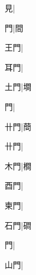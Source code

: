 \begin{multicols}{2}
{{\cjk{}{\cnsym{}　}{\cnsym{}　}見}\mktsJzrVerticalBar{}{\cjk{}{\cnsym{}　}{\cnsym{}　}{\cnsym{}　}}|{}\par
{\cjk{}{\cnsym{}　}{\cnsym{}　}門}\mktsJzrVerticalBar{}{\cjk{}{\cnsym{}　}{\cnsym{}　}{\cnsym{}　}}|{\cjk{}間}\par
{\cjk{}{\cnsym{}　}王門}\mktsJzrVerticalBar{}{\cjk{}{\cnsym{}　}{\cnsym{}　}{\cnsym{}　}}|{}\par
{\cjk{}{\cnsym{}　}耳門}\mktsJzrVerticalBar{}{\cjk{}{\cnsym{}　}{\cnsym{}　}{\cnsym{}　}}|{}\par
{\cjk{}{\cnsym{}　}土門}\mktsJzrVerticalBar{}{\cjk{}{\cnsym{}　}{\cnsym{}　}{\cnsym{}　}}|{\cjk{}墹}\par
{門}\mktsJzrVerticalBar{}{\cjk{}{\cnsym{}　}{\cnsym{}　}{\cnsym{}　}}|{}\par
{\cjk{}{\cnsym{}　}卄門}\mktsJzrVerticalBar{}{\cjk{}{\cnsym{}　}{\cnsym{}　}{\cnsym{}　}}|{\cjk{}蕳}\par
{卄門}\mktsJzrVerticalBar{}{\cjk{}{\cnsym{}　}{\cnsym{}　}{\cnsym{}　}}|{}\par
{\cjk{}{\cnsym{}　}木門}\mktsJzrVerticalBar{}{\cjk{}{\cnsym{}　}{\cnsym{}　}{\cnsym{}　}}|{\cjk{}橺}\par
{\cjk{}{\cnsym{}　}酉門}\mktsJzrVerticalBar{}{\cjk{}{\cnsym{}　}{\cnsym{}　}{\cnsym{}　}}|{}\par
{柬門}\mktsJzrVerticalBar{}{\cjk{}{\cnsym{}　}{\cnsym{}　}{\cnsym{}　}}|{}\par
{\cjk{}{\cnsym{}　}石門}\mktsJzrVerticalBar{}{\cjk{}{\cnsym{}　}{\cnsym{}　}{\cnsym{}　}}|{\cjk{}磵}\par
{門}\mktsJzrVerticalBar{}{\cjk{}{\cnsym{}　}{\cnsym{}　}{\cnsym{}　}}|{}\par
{\cjk{}{\cnsym{}　}山門}\mktsJzrVerticalBar{}{\cjk{}{\cnsym{}　}{\cnsym{}　}{\cnsym{}　}}|{}\par
}
\end{multicols}

